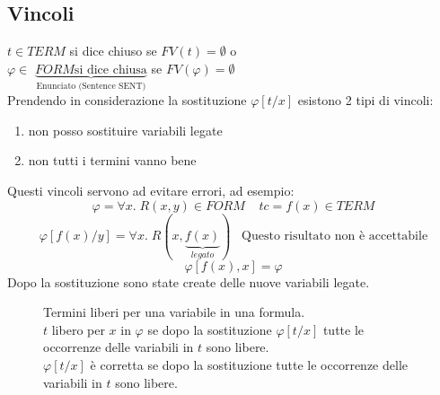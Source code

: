 \documentclass{article}
\theoremstyle{break}
\theoremstyle{break}
\theoremstyle{break}
\theoremstyle{break}
\begin{document}
\subsection{Vincoli}
\( t \in TERM \) si dice chiuso se \( FV(t) = \emptyset \) o\\
\( \varphi \in \) \( \underbrace{ FORM  \text{si dice chiusa}}_{\text{Enunciato (Sentence SENT)}} \)  se \( FV(\varphi) = \emptyset \)
\vspace{1em}\\
Prendendo in considerazione la sostituzione \( \varphi[t/x] \) esistono 2 tipi di vincoli:
\begin{enumerate}
  \item non posso sostituire variabili legate
  \item non tutti i termini vanno bene
\end{enumerate}
Questi vincoli servono ad evitare errori, ad esempio:
\[
\varphi = \forall x.\; R(x,y) \in FORM\;\;\;\;tc=f(x) \in TERM
\] 
\[
  \varphi[f(x)/y] = \forall x.\; R(x, \underbrace{f(x)}_{legato})\;\;\; \text{Questo risultato non è accettabile}
\] 
\[
  \varphi[f(x),x] = \varphi
\] 
Dopo la sostituzione sono state create delle nuove variabili legate.
\begin{figure}[H]
  \begin{definition}
    Termini liberi per una variabile in una formula.
    \vspace{1em}\\
    \( t \) libero per \( x \) in \( \varphi \) se dopo la sostituzione \( \varphi[t/x] \) tutte
    le occorrenze delle variabili in \( t \) sono libere.
    \vspace{1em}\\
    \( \varphi[t/x] \) è corretta se dopo la sostituzione tutte le occorrenze
    delle variabili in \( t \) sono libere.
  \end{definition}
\end{figure}
\end{document}
